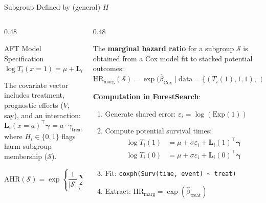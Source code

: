 \documentclass[
  ignorenonframetext,
  aspectratio=169]{beamer}
\begin{document}
\begin{frame}[shrink]{Subgroup Defined by (general) \(H\)}
\label{subgroup-defined-by-general-h}
\begin{columns}[T]
\begin{column}{0.48\textwidth}

\begin{alertblock}{AFT Model Specification}
$$\log T_i(x=1) = \mu + \mathbf{L}_i(1)^{\top} \boldsymbol{\gamma} + \tau\,\varepsilon_i$$
\end{alertblock}

The covariate vector includes treatment, prognostic effects ($V$, say), and an interaction:
$$\mathbf{L}_i(x=a)^{\top}\boldsymbol{\gamma} = a \cdot \gamma_{\text{treat}} + \mathbf{V}_i^{\top}\boldsymbol{\gamma}_V + a \cdot H_i \cdot \gamma_{\text{int}}$$
where $H_i \in \{0,1\}$ flags harm-subgroup membership ($\mathcal{S}$).

$$\text{AHR}(\mathcal{S}) = \exp\!\left\{\frac{1}{|\mathcal{S}|}\sum_{i \in \mathcal{S}} \psi_i^{0}\right\}$$

\end{column}

\begin{column}{0.48\textwidth}

The \textbf{marginal hazard ratio} for a subgroup $\mathcal{S}$ is obtained from a Cox model fit to stacked potential outcomes:
$\text{HR}_{\text{marg}}(\mathcal{S}) = \exp\!\bigl(\hat{\beta}_{\text{Cox}} \;\big|\; \text{data} = \{(T_i(1), 1, 1),\, (T_i(0), 1, 0) : i \in \mathcal{S}\}\bigr)$

\textbf{Computation in ForestSearch}:
\begin{enumerate}
\item Generate shared error: $\varepsilon_i = \log(\text{Exp}(1))$
\item Compute potential survival times:
\begin{align*}
\log T_i(1) &= \mu + \sigma\varepsilon_i + \mathbf{L}_i(1)^{\top}\boldsymbol{\gamma} \\
\log T_i(0) &= \mu + \sigma\varepsilon_i + \mathbf{L}_i(0)^{\top}\boldsymbol{\gamma}
\end{align*}
\item Fit: \texttt{coxph(Surv(time, event) \textasciitilde{} treat)}
\item Extract: $\text{HR}_{\text{marg}} = \exp(\hat{\beta}_{\text{treat}})$
\end{enumerate}

\end{column}
\end{columns}
\end{frame}
\end{document}
